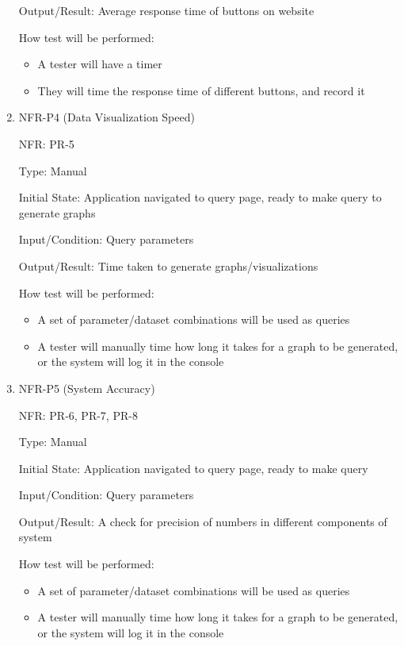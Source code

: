 \documentclass[12pt, titlepage]{article}
\begin{document}
\begin{enumerate}
  Output/Result: Average response time of buttons on website

  How test will be performed:
  \begin{itemize}
    \item A tester will have a timer
    \item They will time the response time of different buttons, and record it
  \end{itemize}

  \item{NFR-P4 (Data Visualization Speed)\\}

  NFR: PR-5

  Type: Manual

  Initial State: Application navigated to query page, ready to make query to
  generate graphs
 
  Input/Condition: Query parameters
  
  Output/Result: Time taken to generate graphs/visualizations
  
  How test will be performed:
  \begin{itemize}
    \item A set of parameter/dataset combinations will be used as queries 
    \item A tester will manually time how long it takes for a graph to be
    generated, or the system will log it in the console
    \end{itemize}

  \item{NFR-P5 (System Accuracy)\\}

  NFR: PR-6, PR-7, PR-8

  Type: Manual

  Initial State: Application navigated to query page, ready to make query
  
  Input/Condition: Query parameters
 
  Output/Result: A check for precision of numbers in different components of
  system
  
  How test will be performed:
  \begin{itemize}
    \item A set of parameter/dataset combinations will be used as queries 
    \item A tester will manually time how long it takes for a graph to be
    generated, or the system will log it in the console
  \end{itemize}


\end{enumerate}
\end{document}
